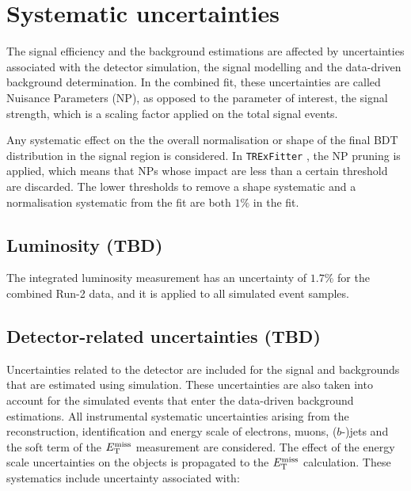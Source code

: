 \section{Systematic uncertainties}
\label{sec:systematics}
The signal efficiency and the background estimations are affected by uncertainties associated with the detector simulation, the signal modelling and the data-driven background determination. In the combined fit, these uncertainties are called Nuisance Parameters (NP), as opposed to the parameter of interest, the signal strength, which is a scaling factor applied on the total signal events.

Any systematic effect on the the overall normalisation or shape of the final BDT distribution in the signal region is considered. In \texttt{TRExFitter} \cite{TRExFitter}, the NP pruning is applied, which means that NPs whose impact are less than a certain threshold are discarded. The lower thresholds to remove a shape systematic and a normalisation systematic from the fit are both $1\%$ in the fit.

%

\subsection{Luminosity (TBD)}
\label{sec:systematic_Luminosity}
The integrated luminosity measurement has an uncertainty of $1.7\%$ for the combined Run-2 data, and it is applied to all simulated event samples.

\subsection{Detector-related uncertainties (TBD)}
\label{sec:syst_det}

Uncertainties related to the detector are included for the signal and backgrounds that are estimated using simulation. These uncertainties are also taken into account for the simulated events that enter the data-driven background estimations. All instrumental systematic uncertainties arising from the reconstruction, identification and energy scale of electrons, muons, ($b$-)jets and the soft term of the $E_{\text{T}}^{\text{miss}}$ measurement are considered. The effect of the energy scale uncertainties on the objects is propagated to the $E_{\text{T}}^{\text{miss}}$ calculation. These systematics include uncertainty associated with:

